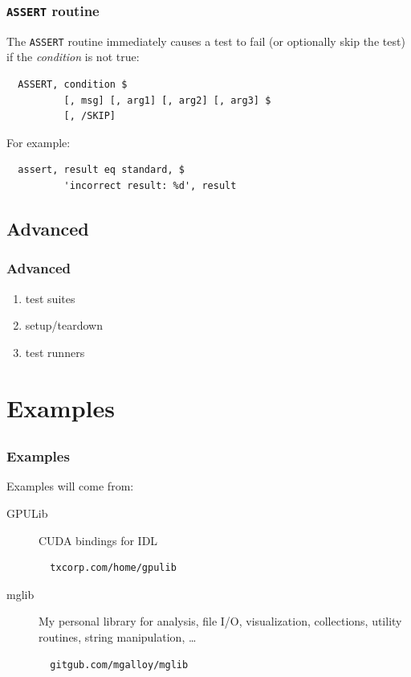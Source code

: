 \documentclass[12pt, handout]{beamer}
\begin{document}
\begin{frame}[t, fragile]
  \frametitle{{\tt ASSERT} routine}

The {\tt ASSERT} routine immediately causes a test to fail (or optionally skip the test) if the {\em condition} is not true:
\begin{lstlisting}
  ASSERT, condition $
          [, msg] [, arg1] [, arg2] [, arg3] $
          [, /SKIP]
\end{lstlisting}
For example:
\begin{lstlisting}
  assert, result eq standard, $
          'incorrect result: %d', result
\end{lstlisting}

\end{frame}

\subsection{Advanced}

\begin{frame}[t, fragile]
  \frametitle{Advanced}
  \begin{enumerate}
    \item test suites
    \item setup/teardown
    \item test runners
  \end{enumerate}
\end{frame}


\section{Examples}
\subsection*{}

\begin{frame}[t, fragile]
  \hypertarget{examples}{}
  \frametitle{Examples}
  Examples will come from:

  \begin{description}
    \item[GPULib] CUDA bindings for IDL
\begin{lstlisting}
  txcorp.com/home/gpulib
\end{lstlisting}
\hyperlink{gpulib}{}

    \item[mglib] My personal library for analysis, file I/O, visualization, collections, utility routines, string manipulation, \ldots
\begin{lstlisting}
  gitgub.com/mgalloy/mglib
\end{lstlisting}
  \end{description}
\end{frame}
\end{document}
